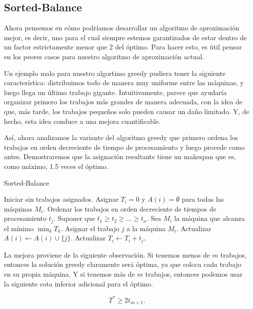 \documentclass{report}
\begin{document}
	\subsection*{Sorted-Balance}
	
	Ahora pensemos en cómo podríamos desarrollar un algoritmo de aproximación mejor, es decir, uno para el cual siempre estemos garantizados de estar dentro de un factor estrictamente menor que 2 del óptimo. Para hacer esto, es útil pensar en los peores casos para nuestro algoritmo de aproximación actual.
	
	Un ejemplo malo para nuestro algortimo greedy pudiera tener la siguiente característica: distribuimos todo de manera muy uniforme entre las máquinas, y luego llega un último trabajo gigante. Intuitivamente, parece que ayudaría organizar primero los trabajos más grandes de manera adecuada, con la idea de que, más tarde, los trabajos pequeños solo pueden causar un daño limitado. Y, de hecho, esta idea conduce a una mejora cuantificable.
	
	Así, ahora analizamos la variante del algoritmo greedy que primero ordena los trabajos en orden decreciente de tiempo de procesamiento y luego procede como antes. Demostraremos que la asignación resultante tiene un makespan que es, como máximo, 1.5 veces el óptimo.
	
	\begin{algorithm}
		\caption{Sorted-Balance}
			\State Iniciar sin trabajos asignados.
			\State Asignar \( T_i = 0 \) y \( A(i) = \emptyset \) para todas las máquinas \( M_i \).
			\State Ordenar los trabajos en orden decreciente de tiempos de procesamiento \( t_j \).
			\State Suponer que \( t_1 \geq t_2 \geq \dots \geq t_n \).
			\State Sea \( M_i \) la máquina que alcanza el mínimo \( \min_k T_k \).
			\State Asignar el trabajo \( j \) a la máquina \( M_i \).
			\State Actualizar \( A(i) \leftarrow A(i) \cup \{j\} \).
			\State Actualizar \( T_i \leftarrow T_i + t_j \).
			\EndFor
	\end{algorithm}
	
	La mejora proviene de la siguiente observación. Si tenemos menos de \( m \) trabajos, entonces la solución greedy claramente será óptima, ya que coloca cada trabajo en su propia máquina. Y si tenemos más de \( m \) trabajos, entonces podemos usar la siguiente cota inferior adicional para el óptimo.
	
	\begin{equation} \label{lem:lower-bound}
	  T^* \geq 2t_{m+1} .
	  	\end{equation}
	
\end{document}
